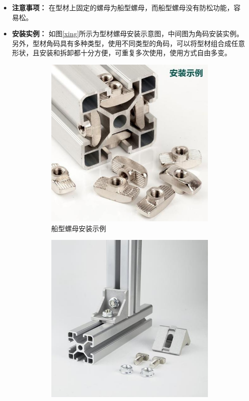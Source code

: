 \documentclass[UTF8]{article} %
\begin{document}
\begin{itemize}
  \item \textbf{注意事项：} 在型材上固定的螺母为船型螺母，而船型螺母没有防松功能，容易松。
  \item \textbf{安装实例：} 如图\ref{xing}所示为型材螺母安装示意图，中间图为角码安装实例。另外，型材角码具有多种类型，使用不同类型的角码，可以将型材组合成任意形状，且安装和拆卸都十分方便，可重复多次使用，使用方式自由多变。
  \begin{figure}[H]
    \centering
    \begin{subfigure}[b]{0.3\textwidth}
           \centering
           \includegraphics[width=\textwidth]{chuan1.png}
            \caption{船型螺母安装示例}
    \end{subfigure}
    \quad
    \begin{subfigure}[b]{0.3\textwidth}
            \centering
            \includegraphics[width=\textwidth]{chaun2.png}

\end{subfigure}
\end{figure}
\end{itemize}
\end{document}
